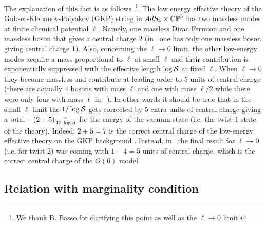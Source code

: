 The explanation of this fact is as follows~\footnote{We thank B. Basso for clarifying this point as well as the $\ell\to 0$ limit.}.
The low energy effective theory of the Gubser-Klebanov-Polyakov (GKP) 
string in $AdS_{4}\times \mathbb{CP}^{3}$  has two massless modes at finite chemical potential $\ell$. Namely, 
one massless Dirac Fermion and one massless boson that gives a central charge 2 (in \ads\ 
one has only one massless boson giving central charge 1). Also, concerning the $\ell\to 0$ limit, 
the other low-energy modes acquire a mass proportional to $\ell$ at small $\ell$ and their
 contribution is exponentially suppressed with the effective length $\log \mathcal S$ at fixed $\ell$. When $\ell\to 0$
  they become massless and contribute at leading order to 5 units of central charge 
  (there are actually 4 bosons with mass $\ell$ and one with mass $\ell/2$ while there were only four with mass $\ell$ in \ads\ ). In other words it should be true that in the small $\ell$ limit the $1/\log\mathcal S$  gets corrected by 
  5 extra units of central charge giving a total $-(2+5)\frac{\pi}{12\,\log\mathcal S}$
for the energy of the vacuum state (i.e. the twist 1 state of the theory). Indeed,  $2+5=7$ is the correct central charge of the low-energy effective theory on the GKP background \cite{Alday:2008ut,Alday:2009zz}. Instead, 
in \ads\  the final result for $\ell\to 0$ (i.e. for twist 2) was coming with $1+4 = 5$ 
units of central charge, which is the correct central charge of the  $O(6)$ model. 


\subsection{Relation with marginality condition}

